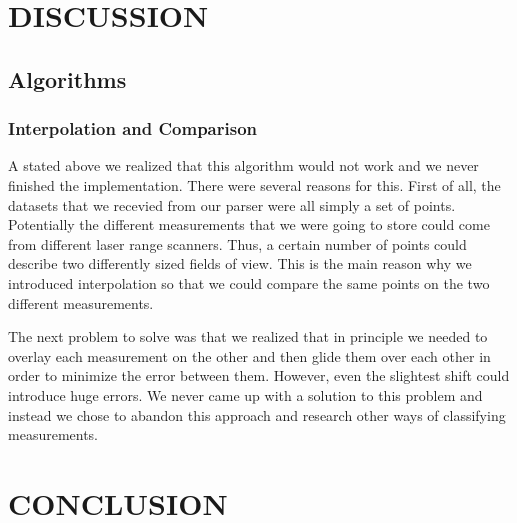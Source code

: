 \documentclass[a4paper, 10pt, conference]{ieeeconf}      %
\begin{document}
\section{DISCUSSION}

\subsection{Algorithms}

\subsubsection{Interpolation and Comparison}
A stated above we realized that this algorithm would not work and we never finished the implementation. There were several reasons for this. First of all, the datasets that we recevied from our parser were all simply a set of points. Potentially the different measurements that we were going to store could come from different laser range scanners. Thus, a certain number of points could describe two differently sized fields of view. This is the main reason why we introduced interpolation so that we could compare the same points on the two different measurements.

The next problem to solve was that we realized that in principle we needed to overlay each measurement on the other and then glide them over each other in order to minimize the error between them. However, even the slightest shift could introduce huge errors. We never came up with a solution to this problem and instead we chose to abandon this approach and research other ways of classifying measurements.

\section{CONCLUSION}










\end{document}
